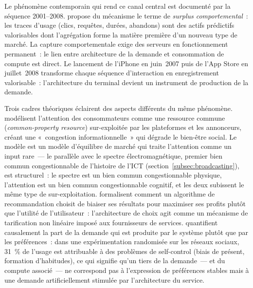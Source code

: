 Le phénomène contemporain qui rend ce canal central est documenté par la séquence 2001--2008. \textcite{zuboff_surveillance_2019} propose du mécanisme le terme de \emph{surplus comportemental}~: les traces d'usage (clics, requêtes, durées, abandons) sont des actifs prédictifs valorisables dont l'agrégation forme la matière première d'un nouveau type de marché. La capture comportementale exige des serveurs en fonctionnement permanent~: le lien entre architecture de la demande et consommation de compute est direct. Le lancement de l'iPhone en juin~2007 puis de l'App Store en juillet~2008 transforme chaque séquence d'interaction en enregistrement valorisable~: l'architecture du terminal devient un instrument de production de la demande.

Trois cadres théoriques éclairent des aspects différents du même phénomène. \textcite{anderson_competition_2012} modélisent l'attention des consommateurs comme une ressource commune (\emph{common-property resource}) sur-exploitée par les plateformes et les annonceurs, créant une «~congestion informationnelle~» qui dégrade le bien-être social. Le modèle est un modèle d'équilibre de marché qui traite l'attention comme un input rare~--- le parallèle avec le spectre électromagnétique, premier bien commun congestionnable de l'histoire de l'ICT (section~\ref{subsec:broadcasting}), est structurel~: le spectre est un bien commun congestionnable physique, l'attention est un bien commun congestionnable cognitif, et les deux subissent le même type de sur-exploitation. \textcite{de_corniere_model_2019} formalisent comment un algorithme de recommandation choisit de biaiser ses résultats pour maximiser ses profits plutôt que l'utilité de l'utilisateur~: l'architecture de choix agit comme un mécanisme de tarification non linéaire imposé aux fournisseurs de services. \textcite{allcott_digital_2022} quantifient causalement la part de la demande qui est produite par le système plutôt que par les préférences~: dans une expérimentation randomisée sur les réseaux sociaux, 31~\% de l'usage est attribuable à des problèmes de self-control (biais de présent, formation d'habitudes), ce qui signifie qu'un tiers de la demande~--- et du compute associé~--- ne correspond pas à l'expression de préférences stables mais à une demande artificiellement stimulée par l'architecture du service.

